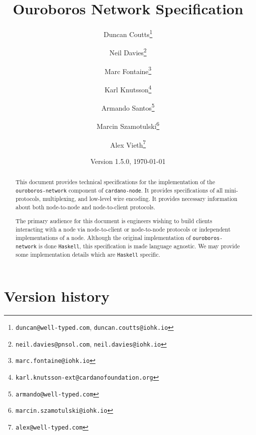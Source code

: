 \documentclass{report}
\begin{document}
\title{Ouroboros Network Specification}
\author{
  Duncan Coutts\footnote{\small \texttt{duncan@well-typed.com}, {\small \texttt{duncan.coutts@iohk.io}}}
\and
  Neil Davies\footnote{{\small \texttt{neil.davies@pnsol.com}}, {\small \texttt{neil.davies@iohk.io}}}
\and
  Marc Fontaine\footnote{{\small \texttt{marc.fontaine@iohk.io}}}
\and
  Karl Knutsson\footnote{{\small \texttt{karl.knutsson-ext@cardanofoundation.org}}}
\and
  Armando Santos\footnote{{\small \texttt{armando@well-typed.com}}}
\and
  Marcin Szamotulski\footnote{{\small \texttt{marcin.szamotulski@iohk.io}}}
\and
  Alex Vieth\footnote{{\small \texttt{alex@well-typed.com}}}
}
\date{{\small Version 1.5.0, \today}}

\maketitle

\begin{abstract}
  This document provides technical specifications for the implementation of the
  \texttt{ouroboros-network} component of \texttt{cardano-node}. It provides specifications of all
  mini-protocols, multiplexing, and low-level wire encoding.  It provides
  necessary information about both node-to-node and node-to-client protocols.

  The primary audience for this document is engineers wishing to build
  clients interacting with a node via node-to-client or node-to-node protocols
  or independent implementations of a node.  Although the original
  implementation of \texttt{ouroboros-network} is done \texttt{Haskell}, this specification is
  made language agnostic. We may provide some implementation details which are
  \texttt{Haskell} specific.
\end{abstract}

\tableofcontents

\pagebreak
\section*{Version history}
\end{document}
